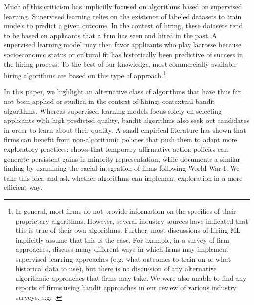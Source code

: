\documentclass[crop,noquery,editorname,historyrev,nosurname,runningno,sepcount]{RESTUD}
\begin{document}
Much of this criticism has implicitly focused on algorithms based on supervised learning.  Supervised learning relies on the existence of labeled datasets to train models to predict a given outcome.  In the context of hiring, these datasets tend to be based on applicants that a firm has seen and hired in the past.  A supervised learning model may then favor applicants who play lacrosse because socioeconomic status or cultural fit has historically been predictive of success in the hiring process. To the best of our knowledge, most commercially available hiring algorithms are based on this type of approach.\footnote{In general, most firms do not provide information on the specifics of their proprietary algorithms.  However, several industry sources have indicated that this is true of their own algorithms.  Further, most discussions of hiring ML implicitly assume that this is the case.  For example, in a survey of firm approaches, \citet{raghavan2019} discuss many different ways in which firms may implement supervised learning approaches (e.g. what outcomes to train on or what historical data to use), but there is no discussion of any alternative algorithmic approaches that firms may take.  We were also unable to find any reports of firms using bandit approaches in our review of various industry surveys, e.g. \citet{mercer2020, upturn}.}  

In this paper, we highlight an alternative class of algorithms that have thus far not been applied or studied in the context of hiring: contextual bandit algorithms. Whereas supervised learning models focus solely on selecting applicants with high predicted quality, bandit algorithms also seek out candidates in order to learn about their quality.  A small empirical literature has shown that firms can benefit from non-algorithmic policies that push them to adopt more exploratory practices: \citet{conradjmp} shows that temporary affirmative action policies can generate persistent gains in minority representation, while \citet{whatley_1990} documents a similar finding by examining the racial integration of firms following World War I.  We take this idea and ask whether algorithms can implement exploration in a more efficient way.  
\end{document}
